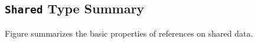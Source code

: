 

%


\subsection{\texttt{Shared} Type Summary}
Figure  summarizes the basic properties
of references on shared data.

